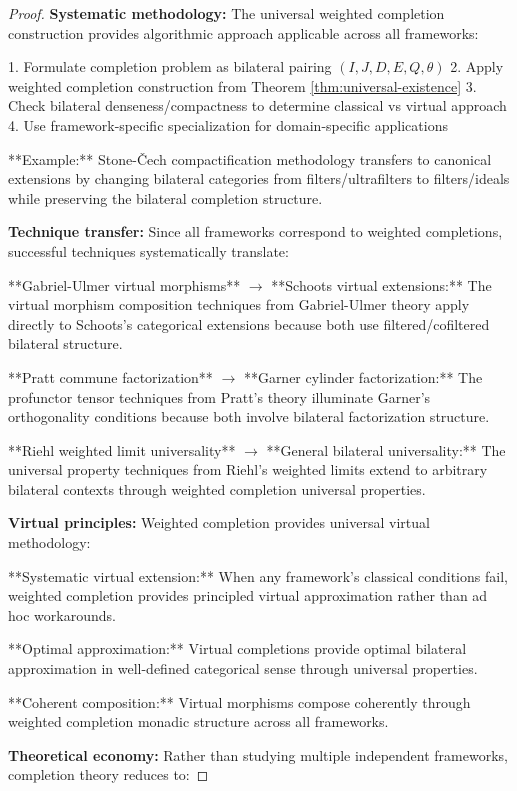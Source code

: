 \documentclass[11pt]{article}
\theoremstyle{plain}
\theoremstyle{definition}
\theoremstyle{remark}
\begin{document}
\begin{proof}
\textbf{Systematic methodology:} The universal weighted completion construction provides algorithmic approach applicable across all frameworks:

1. Formulate completion problem as bilateral pairing $(I, J, D, E, Q, \theta)$
2. Apply weighted completion construction from Theorem \ref{thm:universal-existence}
3. Check bilateral denseness/compactness to determine classical vs virtual approach
4. Use framework-specific specialization for domain-specific applications

**Example:** Stone-\v{C}ech compactification methodology transfers to canonical extensions by changing bilateral categories from filters/ultrafilters to filters/ideals while preserving the bilateral completion structure.

\textbf{Technique transfer:} Since all frameworks correspond to weighted completions, successful techniques systematically translate:

**Gabriel-Ulmer virtual morphisms** $\to$ **Schoots virtual extensions:** The virtual morphism composition techniques from Gabriel-Ulmer theory apply directly to Schoots's categorical extensions because both use filtered/cofiltered bilateral structure.

**Pratt commune factorization** $\to$ **Garner cylinder factorization:** The profunctor tensor techniques from Pratt's theory illuminate Garner's orthogonality conditions because both involve bilateral factorization structure.

**Riehl weighted limit universality** $\to$ **General bilateral universality:** The universal property techniques from Riehl's weighted limits extend to arbitrary bilateral contexts through weighted completion universal properties.

\textbf{Virtual principles:} Weighted completion provides universal virtual methodology:

**Systematic virtual extension:** When any framework's classical conditions fail, weighted completion provides principled virtual approximation rather than ad hoc workarounds.

**Optimal approximation:** Virtual completions provide optimal bilateral approximation in well-defined categorical sense through universal properties.

**Coherent composition:** Virtual morphisms compose coherently through weighted completion monadic structure across all frameworks.

\textbf{Theoretical economy:} Rather than studying multiple independent frameworks, completion theory reduces to:


\end{proof}
\end{document}

